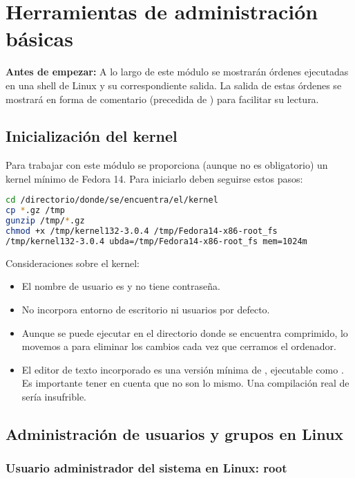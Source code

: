 \section{Herramientas de administración básicas}

\textbf{Antes de empezar:} A lo largo de este módulo se mostrarán órdenes ejecutadas en una shell de Linux y su correspondiente salida.
La salida de estas órdenes se mostrará en forma de comentario (precedida de \code{\#}) para facilitar su lectura.

\subsection{Inicialización del kernel}

Para trabajar con este módulo se proporciona (aunque no es obligatorio) un kernel mínimo de Fedora 14.
Para iniciarlo deben seguirse estos pasos:

\begin{lstlisting}[language=Bash]
cd /directorio/donde/se/encuentra/el/kernel
cp *.gz /tmp
gunzip /tmp/*.gz
chmod +x /tmp/kernel132-3.0.4 /tmp/Fedora14-x86-root_fs
/tmp/kernel132-3.0.4 ubda=/tmp/Fedora14-x86-root_fs mem=1024m
\end{lstlisting}

Consideraciones sobre el kernel:

\begin{itemize}
	\item El nombre de usuario es  y no tiene contraseña.
	\item No incorpora entorno de escritorio ni usuarios por defecto.
	\item Aunque se puede ejecutar en el directorio donde se encuentra comprimido, lo movemos a  para eliminar los cambios cada vez que cerramos el ordenador.
	\item El editor de texto incorporado es una versión mínima de , ejecutable como . Es importante tener en cuenta que no son lo mismo. Una compilación real de  sería insufrible.
\end{itemize}

\subsection{Administración de usuarios y grupos en Linux}

\subsubsection{Usuario administrador del sistema en Linux: root}

